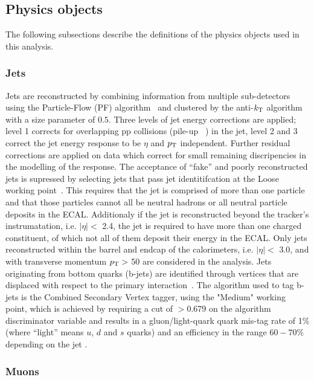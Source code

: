 \clearpage
\subsection{Physics objects\label{sec:reconstruction}}

The following subsections describe the definitions of the physics objects 
used in this analysis.

\subsubsection{Jets\label{recJet}}

Jets are reconstructed by combining information from multiple
sub-detectors using the Particle-Flow (PF) algorithm~\cite{PAS-PFT-09-001} 
and clustered by the anti-$k_{\rm T}$ algorithm~\cite{antikt} with
a size parameter of $0.5$. Three levels of jet energy corrections are 
applied; level 1 corrects for overlapping pp collisions 
(pile-up ~\cite{Cacciari2008119,1126-6708-2008-04-005}) in the jet, 
level 2 and 3 correct the jet energy response to be $\eta$ and $p_{\mathrm{T}}$ independent.  
Further residual corrections are applied on data which correct for 
small remaining discripencies in the modelling of the response. The acceptance of
``fake''  and poorly reconstructed jets is supressed by selecting jets that pass 
jet identitifcation at the Loose working point~\cite{ref:jet-id}. This requires 
that the jet is comprised of more than one particle and that those particles 
cannot all be neutral hadrons or all neutral particle deposits in the ECAL. 
Additionaly if the jet is reconstructed beyond the tracker's instrumatation, 
i.e. $|\eta| <$ 2.4,  the jet is required to have more than one charged constituent, 
of which not all of them deposit their energy in the ECAL. 
Only jets reconstructed within the barrel and endcap of the calorimeters,
i.e. $|\eta| <$ 3.0, and with transverse momentum $p_{\mathrm{T}} >$ 50\gev  
are considered in the analysis. Jets originating from bottom quarks 
(b-jets) are identified through vertices that are displaced with respect to the primary 
interaction~\cite{CMS-PAS-BTV-12-001}. The algorithm used to tag b-jets 
is the Combined Secondary Vertex tagger, using the "Medium" working point, 
which is achieved by requiring a cut of $>$0.679 on the algorithm discriminator 
variable and results in a gluon/light-quark quark mis-tag rate of 1\% 
(where ``light'' means $u$, $d$ and $s$ quarks) and an efficiency in the 
range $60-70\%$ depending on the jet \pt. 

\subsubsection{Muons\label{sec:recMuon}}

